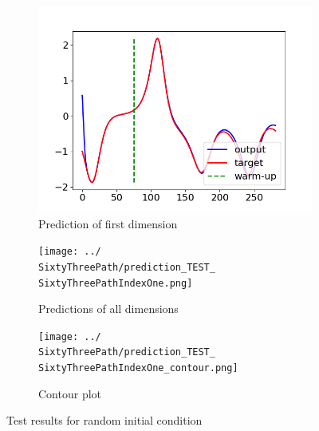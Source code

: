 	\begin{figure}[h]
		\centering
		\begin{subfigure}[b]{0.45\textwidth}
			\includegraphics[width=\textwidth]{../Results/Lorenz-63/Figures/RNN-lstm-RDIM_3-N_used_50000-NUM-LAY_1-SIZE-LAY_100-ACT_tanh-ISH_statefull-SL_8-PL_4-LR_0.0001-DKP_1.0-ZKP_1.0-HSPL_300-IPL_200-NL_1-WID_0/prediction_augmend_TEST_33278.png}
			\caption{Prediction of first dimension}
		\end{subfigure}
		\begin{subfigure}[b]{0.45\textwidth}
			\texttt{[image: ../\\SixtyThreePath/prediction\_TEST\_\\SixtyThreePathIndexOne.png]}
			\caption{Predictions of all dimensions}
		\end{subfigure}
		\begin{subfigure}[b]{\textwidth}
			\texttt{[image: ../\\SixtyThreePath/prediction\_TEST\_\\SixtyThreePathIndexOne\_contour.png]}
			\caption{Contour plot}
		\end{subfigure}
		\caption{Test results for random initial condition \SixtyThreePathIndexOne}
		\label{63:predictions1}
	\end{figure}
	
